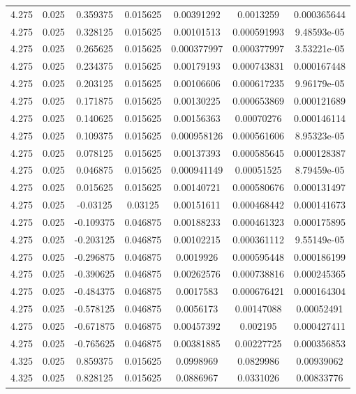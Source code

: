 \begin{flushleft}
\begin{longtable}{ccccccc}
4.275 & 0.025 & 0.359375 & 0.015625 & 0.00391292 & 0.0013259 & 0.000365644  \\ 
4.275 & 0.025 & 0.328125 & 0.015625 & 0.00101513 & 0.000591993 & 9.48593e-05  \\ 
4.275 & 0.025 & 0.265625 & 0.015625 & 0.000377997 & 0.000377997 & 3.53221e-05  \\ 
4.275 & 0.025 & 0.234375 & 0.015625 & 0.00179193 & 0.000743831 & 0.000167448  \\ 
4.275 & 0.025 & 0.203125 & 0.015625 & 0.00106606 & 0.000617235 & 9.96179e-05  \\ 
4.275 & 0.025 & 0.171875 & 0.015625 & 0.00130225 & 0.000653869 & 0.000121689  \\ 
4.275 & 0.025 & 0.140625 & 0.015625 & 0.00156363 & 0.00070276 & 0.000146114  \\ 
4.275 & 0.025 & 0.109375 & 0.015625 & 0.000958126 & 0.000561606 & 8.95323e-05  \\ 
4.275 & 0.025 & 0.078125 & 0.015625 & 0.00137393 & 0.000585645 & 0.000128387  \\ 
4.275 & 0.025 & 0.046875 & 0.015625 & 0.000941149 & 0.00051525 & 8.79459e-05  \\ 
4.275 & 0.025 & 0.015625 & 0.015625 & 0.00140721 & 0.000580676 & 0.000131497  \\ 
4.275 & 0.025 & -0.03125 & 0.03125 & 0.00151611 & 0.000468442 & 0.000141673  \\ 
4.275 & 0.025 & -0.109375 & 0.046875 & 0.00188233 & 0.000461323 & 0.000175895  \\ 
4.275 & 0.025 & -0.203125 & 0.046875 & 0.00102215 & 0.000361112 & 9.55149e-05  \\ 
4.275 & 0.025 & -0.296875 & 0.046875 & 0.0019926 & 0.000595448 & 0.000186199  \\ 
4.275 & 0.025 & -0.390625 & 0.046875 & 0.00262576 & 0.000738816 & 0.000245365  \\ 
4.275 & 0.025 & -0.484375 & 0.046875 & 0.0017583 & 0.000676421 & 0.000164304  \\ 
4.275 & 0.025 & -0.578125 & 0.046875 & 0.0056173 & 0.00147088 & 0.00052491  \\ 
4.275 & 0.025 & -0.671875 & 0.046875 & 0.00457392 & 0.002195 & 0.000427411  \\ 
4.275 & 0.025 & -0.765625 & 0.046875 & 0.00381885 & 0.00227725 & 0.000356853  \\ 
4.325 & 0.025 & 0.859375 & 0.015625 & 0.0998969 & 0.0829986 & 0.00939062  \\ 
4.325 & 0.025 & 0.828125 & 0.015625 & 0.0886967 & 0.0331026 & 0.00833776  \\ 

\end{longtable}
\end{flushleft}
